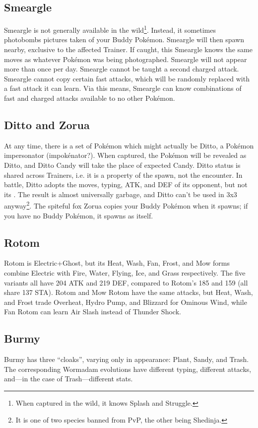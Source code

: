\subsection{Smeargle\label{subsec:smeargle}}
Smeargle is not generally available in the wild\footnote{When captured in the wild, it knows Splash and Struggle.}.
Instead, it sometimes photobombs pictures taken of your Buddy Pokémon.
Smeargle will then spawn nearby, exclusive to the affected Trainer.
If caught, this Smeargle knows the same moves as whatever Pokémon was being photographed.
Smeargle will not appear more than once per day.
Smeargle cannot be taught a second charged attack.
Smeargle cannot copy certain fast attacks, which will be randomly replaced with
 a fast attack it can learn.
Via this means, Smeargle can know combinations of fast and charged attacks available
 to no other Pokémon.

\subsection{Ditto and Zorua\label{subsec:ditto}}
At any time, there is a set of Pokémon which might actually be Ditto,
  a Pokémon impersonator (impokénator?).
When captured, the Pokémon will be revealed as Ditto, and Ditto Candy will take
  the place of expected Candy.
Ditto status is shared across Trainers, i.e. it is a property of the spawn, not the encounter.
In battle, Ditto adopts the moves, typing, ATK, and DEF of its opponent, but not its \MHP\@.
The result is almost universally garbage, and Ditto can't be used in 3x3 anyway\footnote{It is one of two species banned from PvP, the other being Shedinja.}.
The spiteful fox Zorua copies your Buddy Pokémon when it spawns; if you have no Buddy
  Pokémon, it spawns as itself.

\subsection{Rotom}
Rotom is Electric+Ghost, but its Heat, Wash, Fan, Frost, and Mow forms
 combine Electric with Fire, Water, Flying, Ice, and Grass respectively.
The five variants all have 204 ATK and 219 DEF, compared to Rotom's
 185 and 159 (all share 137 STA).
Rotom and Mow Rotom have the same attacks, but Heat, Wash, and Frost
  trade Overheat, Hydro Pump, and Blizzard for Ominous Wind,
  while Fan Rotom can learn Air Slash instead of Thunder Shock.

\subsection{Burmy}
Burmy has three ``cloaks'', varying only in appearance: Plant, Sandy, and Trash.
The corresponding Wormadam evolutions have different typing, different attacks,
 and---in the case of Trash---different stats.

